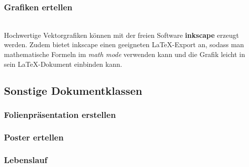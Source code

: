 \subsubsection{Grafiken ertellen}
\\
Hochwertige Vektorgrafiken können mit der freien Software \textbf{inkscape} erzeugt werden. Zudem bietet inkscape einen geeigneten \LaTeX-Export an, sodass man mathematische Formeln im \textit{math mode} verwenden kann und die Grafik leicht in sein \LaTeX-Dokument einbinden kann.



\subsection{Sonstige Dokumentklassen}
\subsubsection{Folienpräsentation erstellen}

\subsubsection{Poster ertellen}

\subsubsection{Lebenslauf}
